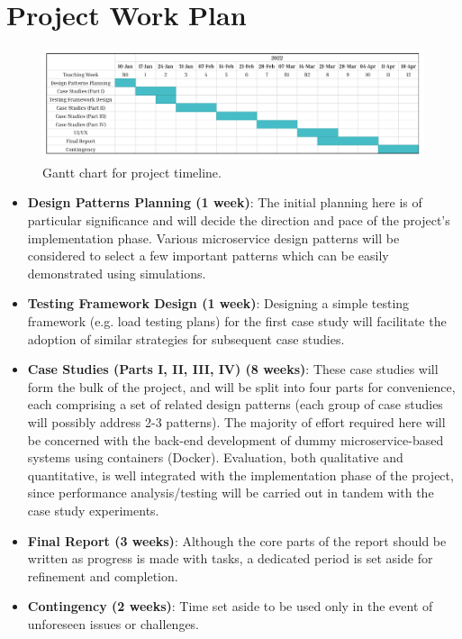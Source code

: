 \section{Project Work Plan}

\begin{figure}[H]
  \centering
  \includegraphics[width=0.9\linewidth]{./assets/images/work-plan-gantt}
  \caption{Gantt chart for project timeline.}
  \label{fig:work-plan-gantt}
\end{figure}

\begin{itemize}
  \item \textbf{Design Patterns Planning (1 week)}: The initial planning here is of particular significance and will decide the direction and pace of the project's implementation phase. Various microservice design patterns will be considered to select a few important patterns which can be easily demonstrated using simulations.

  \item \textbf{Testing Framework Design (1 week)}: Designing a simple testing framework (e.g. load testing plans) for the first case study will facilitate the adoption of similar strategies for subsequent case studies.

  \item \textbf{Case Studies (Parts I, II, III, IV) (8 weeks)}: These case studies will form the bulk of the project, and will be split into four parts for convenience, each comprising a set of related design patterns (each group of case studies will possibly address 2-3 patterns). The majority of effort required here will be concerned with the back-end development of dummy microservice-based systems using containers (Docker). Evaluation, both qualitative and quantitative, is well integrated with the implementation phase of the project, since performance analysis/testing will be carried out in tandem with the case study experiments.

  \item \textbf{Final Report (3 weeks)}: Although the core parts of the report should be written as progress is made with tasks, a dedicated period is set aside for refinement and completion.

  \item \textbf{Contingency (2 weeks)}: Time set aside to be used only in the event of unforeseen issues or challenges.
\end{itemize}

